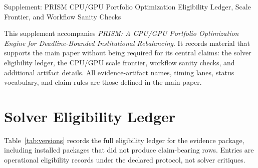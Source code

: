 \documentclass[10pt,a4paper]{extarticle}
\begin{document}
\thispagestyle{firstpage}
\vspace{2pt}

\ACmaketitle%
  {Supplement: PRISM CPU/GPU Portfolio Optimization}%
  {Eligibility Ledger, Scale Frontier, and Workflow Sanity Checks}

\ACauthorline

\noindent
This supplement accompanies \emph{PRISM: A CPU/GPU Portfolio Optimization
Engine for Deadline-Bounded Institutional Rebalancing}. It records material
that supports the main paper without being required for its central claims:
the solver eligibility ledger, the CPU/GPU scale frontier, workflow sanity
checks, and additional artifact details. All evidence-artifact names, timing
lanes, status vocabulary, and claim rules are those defined in the main paper.

\vspace{4pt}

\section{Solver Eligibility Ledger}
\label{app:eligibility}

Table~\ref{tab:versions} records the full eligibility ledger for the evidence
package, including installed packages that did not produce claim-bearing rows.
Entries are operational eligibility records under the declared protocol, not
solver critiques.
\end{document}
